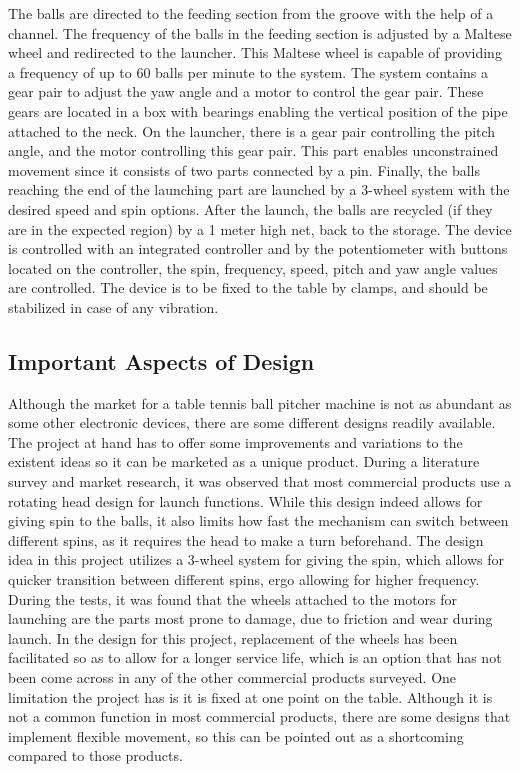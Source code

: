 \documentclass[12pt]{report}
\begin{document}
The balls are directed to the feeding section from the groove with the help of a channel. The frequency of the balls in the feeding section is adjusted by a Maltese wheel and redirected to the launcher. This Maltese wheel is capable of providing a frequency of up to 60 balls per minute to the system. The system contains a gear pair to adjust the yaw angle and a motor to control the gear pair. These gears are located in a box with bearings enabling the vertical position of the pipe attached to the neck. On the launcher, there is a gear pair controlling the pitch angle, and the motor controlling this gear pair.
This part enables unconstrained movement since it consists of two parts connected by a pin. Finally, the balls reaching the end of the launching part are launched by a 3-wheel system with the desired speed and spin options.  After the launch, the balls are recycled (if they are in the expected region) by a 1 meter high net, back to the storage.  
The device is controlled with an integrated controller and by the potentiometer with buttons located on the controller, the spin, frequency, speed, pitch and yaw angle values are controlled. The device is to be fixed to the table by clamps, and should be stabilized in case of any vibration.

\subsection{Important Aspects of Design}

Although the market for a table tennis ball pitcher machine is not as abundant as some other electronic devices, there are some different designs readily available. The project at hand has to offer some improvements and variations to the existent ideas so it can be marketed as a unique product. 
During a literature survey and market research, it was observed that most commercial products use a rotating head design for launch functions. While this design indeed allows for giving spin to the balls, it also limits how fast the mechanism can switch between different spins, as it requires the head to make a turn beforehand. The design idea in this project utilizes a 3-wheel system for giving the spin, which allows for quicker transition between different spins, ergo allowing for higher frequency.
During the tests, it was found that the wheels attached to the motors for launching are the parts most prone to damage, due to friction and wear during launch. In the design for this project, replacement of the wheels has been facilitated so as to allow for a longer service life, which is an option that has not been come across in any of the other commercial products surveyed.
One limitation the project has is it is fixed at one point on the table. Although it is not a common function in most commercial products, there are some designs that implement flexible movement, so this can be pointed out as a shortcoming compared to those products.
\end{document}
